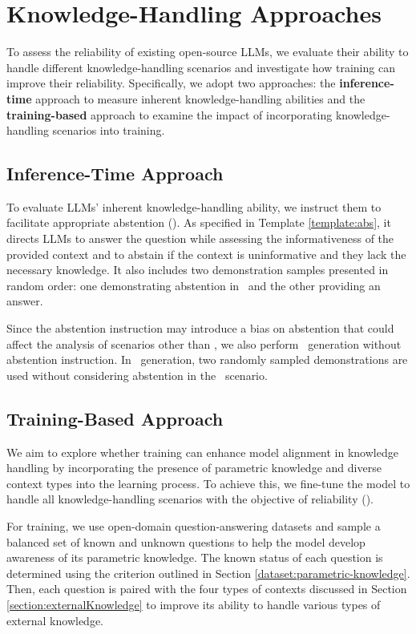 \section{Knowledge-Handling Approaches}

To assess the reliability of existing open-source LLMs, we evaluate their ability to handle different knowledge-handling scenarios and investigate how training can improve their reliability. 
Specifically, we adopt two approaches: the \textbf{inference-time} approach to measure inherent knowledge-handling abilities and the \textbf{training-based} approach to examine the impact of incorporating knowledge-handling scenarios into training.


\subsection{Inference-Time Approach}


To evaluate LLMs' inherent knowledge-handling ability, we instruct them to facilitate appropriate abstention (\textbf{\absinst}).
As specified in Template \ref{template:abs}, it directs LLMs to answer the question while assessing the informativeness of the provided context and to abstain if the context is uninformative and they lack the necessary knowledge.
It also includes two demonstration samples presented in random order: one demonstrating abstention in \UU\ and the other providing an answer.


Since the abstention instruction may introduce a bias on abstention that could affect the analysis of scenarios other than \UU, we also perform \textbf{\naive}\ generation without abstention instruction.
In \naive\ generation, two randomly sampled demonstrations are used without considering abstention in the \UU\ scenario.




\subsection{Training-Based Approach}

We aim to explore whether training can enhance model alignment in knowledge handling by incorporating the presence of parametric knowledge and diverse context types into the learning process.
To achieve this, we fine-tune the model to handle all knowledge-handling scenarios with the objective of reliability (\ours).


For training, we use open-domain question-answering datasets and sample a balanced set of known and unknown questions to help the model develop awareness of its parametric knowledge.
The known status of each question is determined using the criterion outlined in Section \ref{dataset:parametric-knowledge}.
Then, each question is paired with the four types of contexts discussed in Section \ref{section:externalKnowledge} to improve its ability to handle various types of external knowledge.


